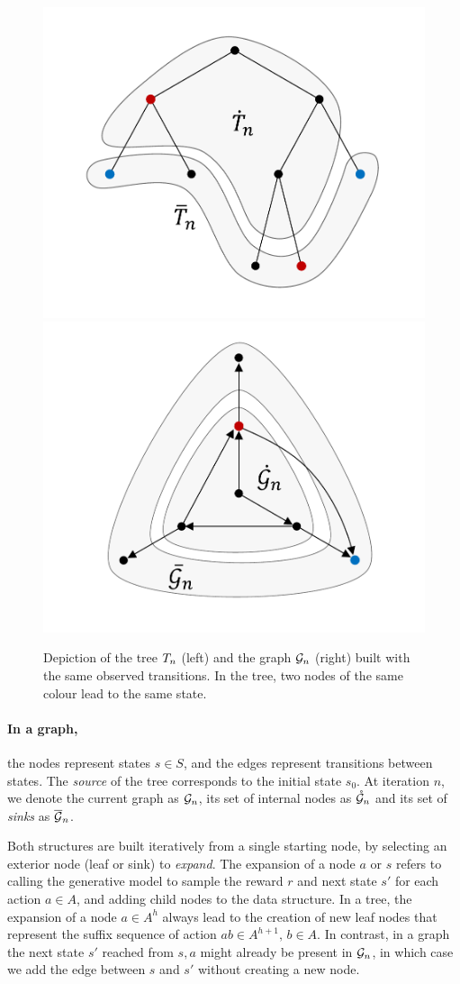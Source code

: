 \documentclass[runningheads]{llncs}
\begin{document}
\begin{figure}[H]
	\centering
	\includegraphics[trim={1.8cm 1.2cm 1.9cm 1.2cm}, clip,width=0.44\linewidth]{img/tree_1}
	\hfill
	\includegraphics[trim={1.8cm 1.2cm 1.9cm 0.9cm}, clip,width=0.44\linewidth]{img/graph_1}
	\caption{Depiction of the tree $T_n$ (left) and the graph $\mathcal{G}_n$ (right) built with the same observed transitions. In the tree, two nodes of the same colour lead to the same state.}
\end{figure}

\paragraph{In a graph,} the nodes represent states $s\in S$, and the edges represent transitions between states. The \textit{source} of the tree corresponds to the initial state $s_0$. At iteration $n$, we denote the current graph as $\mathcal{G}_n$, its set of internal nodes as $\mathring{\mathcal{G}}_n$ and its set of \textit{sinks} as $\overline{\mathcal{G}}_n$.

Both structures are built iteratively from a single starting node, by selecting an exterior node (leaf or sink) to \emph{expand}. The expansion of a node $a$ or $s$ refers to calling the generative model to sample the reward $r$ and next state $s'$ for each action $a\in A$, and adding child nodes to the data structure. In a tree, the expansion of a node $a\in A^h$ always lead to the creation of new leaf nodes that represent the suffix sequence of action $ab\in A^{h+1},\, b\in A$. In contrast, in a graph the next state $s'$ reached from $s,a$ might already be present in $\mathcal{G}_n$, in which case we add the edge between $s$ and $s'$ without creating a new node.
\end{document}
